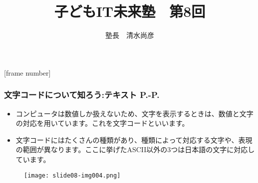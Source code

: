 
\graphicspath{%
{./slide08-img/}%
{./text08-img/}%
}



[frame number]
\title{子どもIT未来塾　第8回}
\author{塾長　清水尚彦}

\def\quiz{1}



\begin{frame}[fragile]
	\frametitle{文字コードについて知ろう:テキスト P.\pageref{1:P:charCode}-P.\pageref{1:P:scraping}~~~}
    \begin{itemize}
        \item コンピュータは数値しか扱えないため、文字を表示するときは、数値と文字の対応を用いています。これを文字コードといいます。
        \item 文字コードにはたくさんの種類があり、種類によって対応する文字や、表現の範囲が異なります。ここに挙げたASCII以外の3つは日本語の文字に対応しています。
    \end{itemize}
    \begin{figure}
      \centering
      \texttt{[image: slide08-img004.png]}
    \end{figure}
\end{frame}

